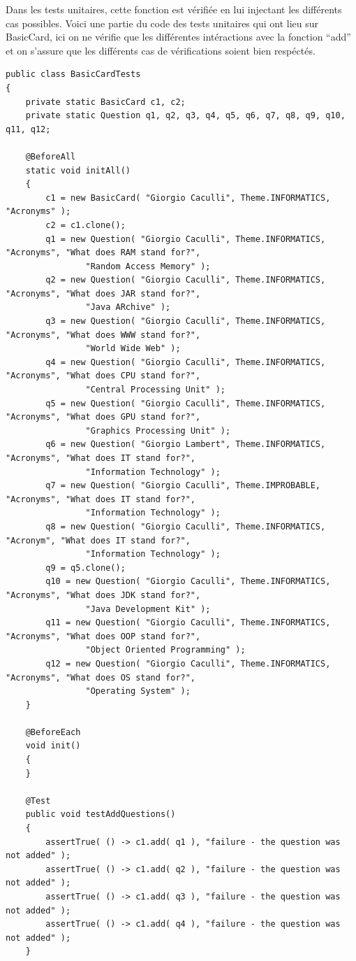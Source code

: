 Dans les tests unitaires, cette fonction est vérifiée en lui injectant les différents cas possibles.
Voici une partie du code des tests unitaires qui ont lieu sur BasicCard, ici on ne vérifie que les différentes intéractions avec la fonction ``add'' et on s'assure que les différents cas de vérifications soient bien respéctés.

\begin{lstlisting}
public class BasicCardTests
{
    private static BasicCard c1, c2;
    private static Question q1, q2, q3, q4, q5, q6, q7, q8, q9, q10, q11, q12;

    @BeforeAll
    static void initAll()
    {
        c1 = new BasicCard( "Giorgio Caculli", Theme.INFORMATICS, "Acronyms" );
        c2 = c1.clone();
        q1 = new Question( "Giorgio Caculli", Theme.INFORMATICS, "Acronyms", "What does RAM stand for?",
                "Random Access Memory" );
        q2 = new Question( "Giorgio Caculli", Theme.INFORMATICS, "Acronyms", "What does JAR stand for?",
                "Java ARchive" );
        q3 = new Question( "Giorgio Caculli", Theme.INFORMATICS, "Acronyms", "What does WWW stand for?",
                "World Wide Web" );
        q4 = new Question( "Giorgio Caculli", Theme.INFORMATICS, "Acronyms", "What does CPU stand for?",
                "Central Processing Unit" );
        q5 = new Question( "Giorgio Caculli", Theme.INFORMATICS, "Acronyms", "What does GPU stand for?",
                "Graphics Processing Unit" );
        q6 = new Question( "Giorgio Lambert", Theme.INFORMATICS, "Acronyms", "What does IT stand for?",
                "Information Technology" );
        q7 = new Question( "Giorgio Caculli", Theme.IMPROBABLE, "Acronyms", "What does IT stand for?",
                "Information Technology" );
        q8 = new Question( "Giorgio Caculli", Theme.INFORMATICS, "Acronym", "What does IT stand for?",
                "Information Technology" );
        q9 = q5.clone();
        q10 = new Question( "Giorgio Caculli", Theme.INFORMATICS, "Acronyms", "What does JDK stand for?",
                "Java Development Kit" );
        q11 = new Question( "Giorgio Caculli", Theme.INFORMATICS, "Acronyms", "What does OOP stand for?",
                "Object Oriented Programming" );
        q12 = new Question( "Giorgio Caculli", Theme.INFORMATICS, "Acronyms", "What does OS stand for?",
                "Operating System" );
    }

    @BeforeEach
    void init()
    {
    }

    @Test
    public void testAddQuestions()
    {
        assertTrue( () -> c1.add( q1 ), "failure - the question was not added" );
        assertTrue( () -> c1.add( q2 ), "failure - the question was not added" );
        assertTrue( () -> c1.add( q3 ), "failure - the question was not added" );
        assertTrue( () -> c1.add( q4 ), "failure - the question was not added" );
    }


\end{lstlisting}
